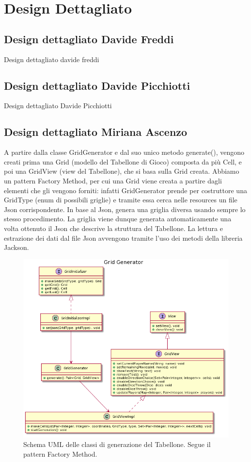 \documentclass[a4paper,12pt]{report}
\begin{document}
\section{Design Dettagliato}

\subsection{Design dettagliato Davide Freddi}
Design dettagliato davide freddi

\subsection{Design dettagliato Davide Picchiotti}
Design dettagliato Davide Picchiotti

\subsection{Design dettagliato Miriana Ascenzo}

A partire dalla classe GridGenerator e dal suo unico metodo generate(), vengono creati prima una Grid (modello del Tabellone di Gioco) composta da più Cell, e poi una GridView (view del Tabellone), che si basa sulla Grid creata.
%
Abbiamo un pattern Factory Method, per cui una Grid viene creata a partire dagli elementi che gli vengono forniti: infatti GridGenerator prende per costruttore una GridType (enum di possibili griglie) e tramite essa cerca nelle resources un file Json corrispondente.
%
In base al Json, genera una griglia diversa usando sempre lo stesso procedimento.
%
La griglia viene dunque generata automaticamente una volta ottenuto il Json che descrive la struttura del Tabellone.
%
La lettura e estrazione dei dati dal file Json avvengono tramite l’uso dei metodi della libreria Jackson.

\begin{figure}[!t]
\centering{}
\includegraphics[width=\textwidth]{images/miriana/grid_generator.png}
\caption{Schema UML delle classi di generazione del Tabellone. Segue il pattern Factory Method.}
\label{img:gridfactorymethod}
\end{figure}
\end{document}

